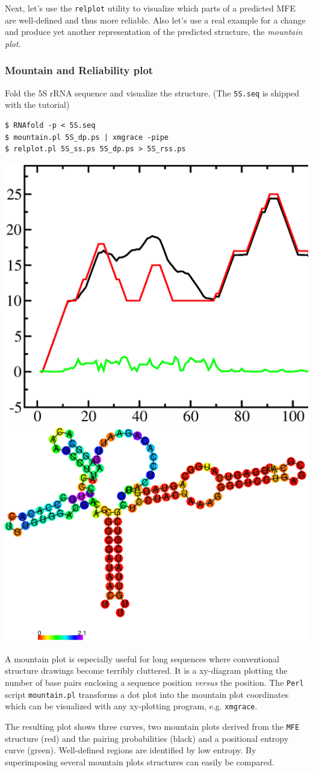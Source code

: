 \documentclass[a4paper]{article}
\newcommand{\frametitle}[1]{\subsubsection{#1}}
\begin{document}
Next, let's use the \texttt{relplot} utility to visualize which parts of a
predicted MFE are well-defined and thus more reliable. Also let's use a real 
example for a change and produce yet another representation of the predicted 
structure, the \emph{mountain plot}.

\pagebreak[2]
\frametitle{Mountain and Reliability plot}
\noindent
Fold the 5S rRNA sequence and visualize the structure. (The \texttt{5S.seq} is shipped with the tutorial)
\begin{verbatim}
$ RNAfold -p < 5S.seq
$ mountain.pl 5S_dp.ps | xmgrace -pipe
$ relplot.pl 5S_ss.ps 5S_dp.ps > 5S_rss.ps
\end{verbatim}%

  \includegraphics[width=.45\textwidth]{Figures/5S_mt.eps}\hfill  
  \includegraphics[trim=0cm 1.5cm 0cm 0cm, width=.50\textwidth]{Figures/5S_rot.eps}

A mountain plot is especially useful for long sequences where conventional
structure drawings become terribly cluttered.  It is a xy-diagram plotting
the number of base pairs enclosing a sequence position \textit{versus} the
position. The  \texttt{Perl} script \texttt{mountain.pl} transforms a dot
plot into the mountain plot coordinates which can be visualized with any
xy-plotting program, e.g. \texttt{xmgrace}.

The resulting plot shows three curves, two mountain plots derived from
the \texttt{MFE} structure (red) and the pairing probabilities (black) and
a positional entropy curve (green). Well-defined regions are identified by low
entropy. By superimposing several mountain plots structures can easily
be compared.\\
\end{document}

